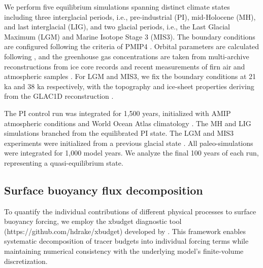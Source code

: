 \documentclass[draft]{agujournal2025}
\begin{document}
We perform five equilibrium simulations spanning distinct climate states including three interglacial periods, i.e., pre-industrial (PI), mid-Holocene (MH), and last interglacial (LIG), and two glacial periods, i.e., the Last Glacial Maximum (LGM) and Marine Isotope Stage 3 (MIS3). The boundary conditions are configured following the criteria of PMIP4 \cite{otto2017pmip4}. Orbital parameters are calculated following , and the greenhouse gas concentrations are taken from multi-archive reconstructions from ice core records and recent measurements of firn air and atmospheric samples \cite{fluckiger2002high,monnin2004evidence,schilt2010glacial,buiron2011taldice,schneider2013reconstruction,kohler2017156}.  For LGM and MIS3, we fix the boundary conditions at 21 ka and 38 ka respectively, with the topography and ice-sheet properties deriving from the GLAC1D reconstruction  \cite{tarasov2003greenland,tarasov2012data,briggs2014data}.

The PI control run was integrated for 1,500 years, initialized with AMIP atmospheric conditions \cite{roeckner2004atmospheric} and World Ocean Atlas climatology \cite{levitus2010world}. The MH and LIG simulations branched from the equilibrated PI state. The LGM and MIS3 experiments were initialized from a previous glacial state \cite{werner2016glacial}. All paleo-simulations were integrated for 1,000 model years. We analyze the final 100 years of each run, representing a quasi-equilibrium state.


\subsection{Surface buoyancy flux decomposition}


To quantify the individual contributions of different physical processes to surface buoyancy forcing, we employ the xbudget diagnostic tool  (https://github.com/hdrake/xbudget) developed by . This framework enables systematic decomposition of tracer budgets into individual forcing terms while maintaining numerical consistency with the underlying model's finite-volume discretization.
\end{document}
